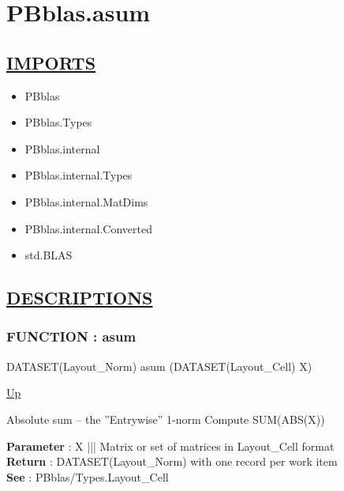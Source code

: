 \chapter*{PBblas.asum}
\hypertarget{ecldoc:toc:PBblas.asum}{}

\section*{\underline{IMPORTS}}
\begin{itemize}
\item PBblas
\item PBblas.Types
\item PBblas.internal
\item PBblas.internal.Types
\item PBblas.internal.MatDims
\item PBblas.internal.Converted
\item std.BLAS
\end{itemize}

\section*{\underline{DESCRIPTIONS}}
\subsection*{FUNCTION : asum}
\hypertarget{ecldoc:pbblas.asum}{}
\begin{minipage}[t]{\textwidth}
\begin{flushleft}
DATASET(Layout\_Norm) asum (DATASET(Layout\_Cell) X)
\end{flushleft}
\end{minipage}
\hyperlink{ecldoc:toc:PBblas}{Up}

\par
Absolute sum -- the ''Entrywise'' 1-norm Compute SUM(ABS(X))
\par
\textbf{Parameter} : X ||| Matrix or set of matrices in Layout\_Cell format \\
\textbf{Return} : DATASET(Layout\_Norm) with one record per work item \\
\textbf{See} : PBblas/Types.Layout\_Cell \\
